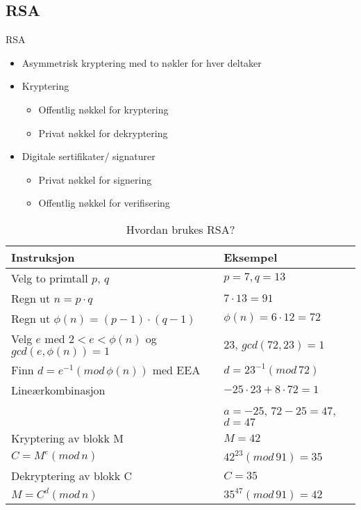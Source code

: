 \subsection*{RSA}
\begin{frame}{RSA}
\begin{itemize}
\item Asymmetrisk kryptering med to nøkler for hver deltaker
\item Kryptering
	\begin{itemize}
	\item Offentlig nøkkel for kryptering
	\item Privat nøkkel for dekryptering
	\end{itemize}
\item Digitale sertifikater/ signaturer
	\begin{itemize}
	\item Privat nøkkel for signering
	\item Offentlig nøkkel for verifisering
	\end{itemize}
\end{itemize}
\end{frame}


\begin{frame}{}
\begin{table}
\begin{tabular}{l|l}
Instruksjon & Eksempel\\ \hline
Velg to primtall $p$, $q$ & $p=7, q=13$\\
Regn ut $n=p\cdot q$ & $7\cdot 13=91$\\
Regn ut $\phi(n)=(p-1)\cdot(q-1)$&$\phi(n)=6\cdot12=72$\\
Velg $e$ med $2<e<\phi(n)$ og $gcd(e,\phi(n))=1$&23, $gcd(72,23)=1$\\
Finn $d=e^{-1} (mod\, \phi(n))$ med EEA & $d=23^{-1} (mod\, 72)$\\
\indent\hspace{3mm} Lineærkombinasjon & $-25\cdot 23+8\cdot 72=1$\\
& $a=-25$, $72-25=47$, $d=47$\\
Kryptering av blokk M & $M=42$\\
\indent\hspace{3mm} $C=M^e(mod\, n)$&$42^{23} (mod\, 91)=35$\\
Dekryptering av blokk C & $C=35$\\
\indent\hspace{3mm} $M=C^d(mod\, n)$&$35^{47} (mod\, 91)=42$
\end{tabular}
\caption{Hvordan brukes RSA?}
\end{table}
\end{frame}
